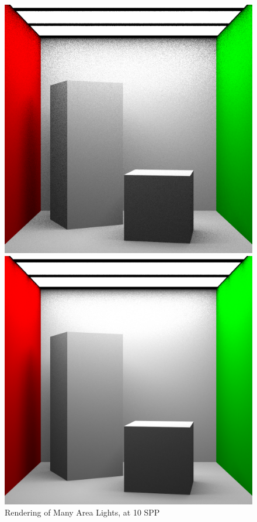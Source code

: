 \documentclass[a4paper]{myarticle}
\begin{document}
\begin{figure}[H]
  \begin{minipage}[t]{.3\textwidth}
      \centering
      \includegraphics[width=\textwidth]{q3/many_2_10.png}
      \caption{Rendering of Many Area Lights, at 10 SPP}
  \end{minipage}
  \hfill
  \begin{minipage}[t]{.3\textwidth}
      \centering
      \includegraphics[width=\textwidth]{q3/many_2_100.png}

\end{minipage}
\end{figure}
\end{document}
